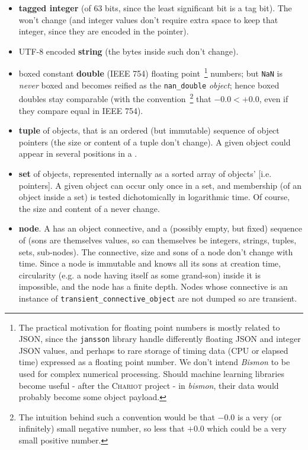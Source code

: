\begin{itemize}

\item \textbf{tagged integer} (of 63 bits, since the least significant
  bit is a tag bit). The  won't change (and
  integer values don't require extra space to keep that integer, since
  they are encoded in the pointer).
  
\item UTF-8 encoded \textbf{string} (the bytes inside such
   don't change).

  \item boxed constant \textbf{double}   (IEEE 754) floating
    point~\footnote{The practical motivation for floating point
      numbers is mostly related to JSON, since the \texttt{jansson}
      library handle differently floating JSON and integer JSON
      values, and perhaps to rare storage of timing data (CPU or
      elapsed time) expressed as a floating point number. We don't
      intend \emph{Bismon} to be used for complex numerical
      processing. Should machine learning libraries become useful -
      after the \textsc{Chariot} project - in \emph{bismon}, their
      data would probably become some object payload.}  numbers; but
    \texttt{NaN} is \emph{never} boxed and becomes reified as the
    \texttt{nan\_double} \emph{object}; hence boxed doubles stay
    comparable (with the convention~\footnote{The intuition behind
      such a convention would be that $-0.0$ is a very (or infinitely)
      small negative number, so less that $+0.0$ which could be a very
      small positive number.}  that $-0.0 < +0.0$, even if they
    compare equal in IEEE 754).

  \item \textbf{tuple} of objects, that is an ordered (but immutable)
    sequence of object pointers (the size or content of a tuple don't
    change). A given object could appear in several positions in a
    .

  \item \textbf{set} of objects, represented internally as a sorted
    array of objects' [i.e. pointers]. A given object can occur only once in a
    set, and membership (of an object inside a set) is tested
    dichotomically in logarithmic time. Of course, the size and
    content of a  never change.

  \item \textbf{node}. A  has an object connective,
    and a (possibly empty, but fixed) sequence of 
    (sons are themselves values, so can themselves be integers,
    strings, tuples, sets, sub-nodes). The connective, size and sons
    of a node don't change with time. Since a node is immutable and
    knows all its sons at creation time, circularity (e.g. a node
    having itself as some grand-son) inside it is impossible, and the
    node has a finite depth. Nodes whose connective is an instance of
    \texttt{transient\_connective\_object} are not dumped so are
    transient.  


\end{itemize}
